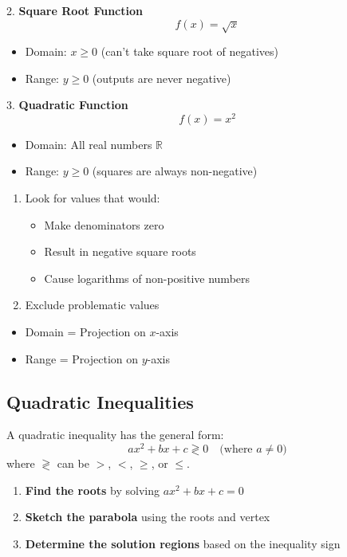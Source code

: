 \documentclass{article} %
\begin{document}
2. \textbf{Square Root Function}
\[
f(x) = \sqrt{x}
\]
\begin{itemize}
    \item Domain: $x \geq 0$ (can't take square root of negatives)
    \item Range: $y \geq 0$ (outputs are never negative)
\end{itemize}

3. \textbf{Quadratic Function}
\[
f(x) = x^2
\]
\begin{itemize}
    \item Domain: All real numbers $\mathbb{R}$
    \item Range: $y \geq 0$ (squares are always non-negative)
\end{itemize}

\begin{enumerate}
    \item Look for values that would:
    \begin{itemize}
        \item Make denominators zero
        \item Result in negative square roots
        \item Cause logarithms of non-positive numbers
    \end{itemize}
    \item Exclude problematic values
\end{enumerate}

\begin{itemize}
    \item Domain = Projection on $x$-axis
    \item Range = Projection on $y$-axis
\end{itemize}

\subsection{Quadratic Inequalities}

A quadratic inequality has the general form:
\[
ax^2 + bx + c \gtrless 0 \quad \text{(where } a \neq 0\text{)}
\]
where $\gtrless$ can be $>$, $<$, $\geq$, or $\leq$.

\begin{enumerate}
    \item \textbf{Find the roots} by solving $ax^2 + bx + c = 0$
    \item \textbf{Sketch the parabola} using the roots and vertex
    \item \textbf{Determine the solution regions} based on the inequality sign
\end{enumerate}
\end{document}
